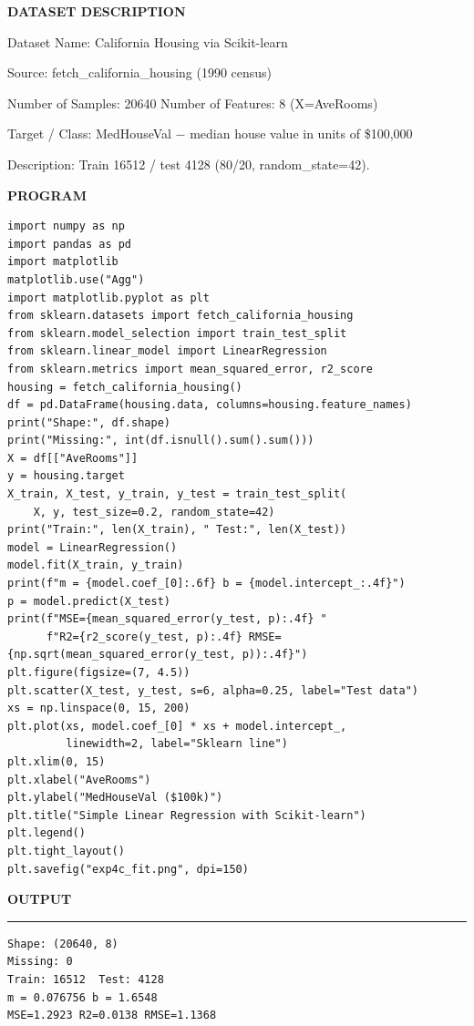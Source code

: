 \documentclass[11pt,twoside]{article}
\newcommand{\expheading}[1]{{\fontsize{14}{17}\selectfont\textbf{#1}\par}}
\newcommand{\toevenpage}{\clearpage\ifodd\value{page}\null\thispagestyle{empty}\newpage\fi}
\begin{document}
{\expheading{DATASET DESCRIPTION}
\vspace{4pt}
\noindent Dataset Name: California Housing via Scikit-learn\par
\noindent Source: fetch\_california\_housing (1990 census)\par
\noindent Number of Samples: 20640 \hspace{0.3cm} Number of Features: 8 (X=AveRooms)\par
\noindent Target / Class: MedHouseVal $-$ median house value in units of \$100{,}000\par
\noindent Description: Train 16512 / test 4128 (80/20, random\_state=42). \par
\vspace{4pt}
} %
\toevenpage
\expheading{PROGRAM}
\vspace{6pt}

\begin{lstlisting}
import numpy as np
import pandas as pd
import matplotlib
matplotlib.use("Agg")
import matplotlib.pyplot as plt
from sklearn.datasets import fetch_california_housing
from sklearn.model_selection import train_test_split
from sklearn.linear_model import LinearRegression
from sklearn.metrics import mean_squared_error, r2_score
housing = fetch_california_housing()
df = pd.DataFrame(housing.data, columns=housing.feature_names)
print("Shape:", df.shape)
print("Missing:", int(df.isnull().sum().sum()))
X = df[["AveRooms"]]
y = housing.target
X_train, X_test, y_train, y_test = train_test_split(
    X, y, test_size=0.2, random_state=42)
print("Train:", len(X_train), " Test:", len(X_test))
model = LinearRegression()
model.fit(X_train, y_train)
print(f"m = {model.coef_[0]:.6f} b = {model.intercept_:.4f}")
p = model.predict(X_test)
print(f"MSE={mean_squared_error(y_test, p):.4f} "
      f"R2={r2_score(y_test, p):.4f} RMSE={np.sqrt(mean_squared_error(y_test, p)):.4f}")
plt.figure(figsize=(7, 4.5))
plt.scatter(X_test, y_test, s=6, alpha=0.25, label="Test data")
xs = np.linspace(0, 15, 200)
plt.plot(xs, model.coef_[0] * xs + model.intercept_,
         linewidth=2, label="Sklearn line")
plt.xlim(0, 15)
plt.xlabel("AveRooms")
plt.ylabel("MedHouseVal ($100k)")
plt.title("Simple Linear Regression with Scikit-learn")
plt.legend()
plt.tight_layout()
plt.savefig("exp4c_fit.png", dpi=150)
\end{lstlisting}
\toevenpage
\expheading{OUTPUT}
\vspace{2pt}
\noindent\rule{\textwidth}{0.5pt}\par
\vspace{4pt}
\begin{verbatim}
Shape: (20640, 8)
Missing: 0
Train: 16512  Test: 4128
m = 0.076756 b = 1.6548
MSE=1.2923 R2=0.0138 RMSE=1.1368
\end{verbatim}
\vspace{4pt}
\end{document}

